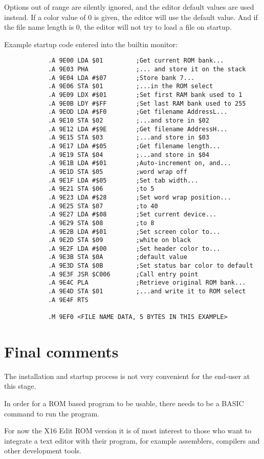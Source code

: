 \documentclass{article}
\begin{document}
        \vspace{1em}Options out of range are silently ignored, and the editor default values are used instead. If a color value of 0 is given, the
        editor will use the default value. And if the file name length is 0, the editor will not try to load a file on startup.

        Example startup code entered into the builtin monitor:

        \begin{verbatim}
            .A 9E00 LDA $01         ;Get current ROM bank...
            .A 9E03 PHA             ;... and store it on the stack
            .A 9E04 LDA #$07        ;Store bank 7...
            .A 9E06 STA $01         ;...in the ROM select
            .A 9E09 LDX #$01        ;Set first RAM bank used to 1
            .A 9E0B LDY #$FF        ;Set last RAM bank used to 255
            .A 9EOD LDA #$F0        ;Get filename AddressL...
            .A 9E10 STA $02         ;...and store in $02
            .A 9E12 LDA #$9E        ;Get filename AddressH...
            .A 9E15 STA $03         ;...and store in $03
            .A 9E17 LDA #$05        ;Get filename length...
            .A 9E19 STA $04         ;...and store in $04
            .A 9E1B LDA #$01        ;Auto-increment on, and...
            .A 9E1D STA $05         ;word wrap off
            .A 9E1F LDA #$05        ;Set tab width...
            .A 9E21 STA $06         ;to 5
            .A 9E23 LDA #$28        ;Set word wrap position...
            .A 9E25 STA $07         ;to 40
            .A 9E27 LDA #$08        ;Set current device...
            .A 9E29 STA $08         ;to 8
            .A 9E2B LDA #$01        ;Set screen color to...
            .A 9E2D STA $09         ;white on black
            .A 9E2F LDA #$00        ;Set header color to...
            .A 9E3B STA $0A         ;default value
            .A 9E3D STA $0B         ;Set status bar color to default
            .A 9E3F JSR $C006       ;Call entry point
            .A 9E4C PLA             ;Retrieve original ROM bank...
            .A 9E4D STA $01         ;...and write it to ROM select
            .A 9E4F RTS

            .M 9EF0 <FILE NAME DATA, 5 BYTES IN THIS EXAMPLE>
        \end{verbatim} 


\section{Final comments}

    The installation and startup process is not very convenient for the end-user at this stage. 
    
    In order for a ROM based program to be usable, there needs to be a BASIC command to run the program. 
    
    For now the X16 Edit ROM version it is of  most interest to those who want to integrate a text 
    editor with their program, for example assemblers, compilers and other development tools.
\end{document}
